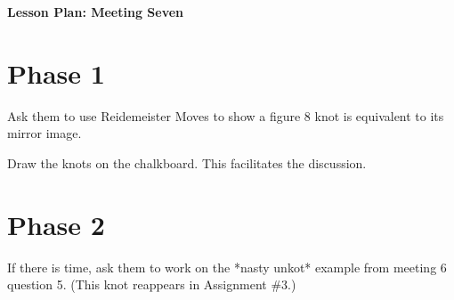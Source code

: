 \documentclass[12pt]{amsart}
\theoremstyle{definition}
\begin{document}
\begin{center}
\textbf{\Huge
Lesson Plan: Meeting Seven
}
\end{center}
\vspace{.5in}

\section*{Phase 1}
Ask them to use Reidemeister Moves to show a figure 8 knot is equivalent to its mirror image.

Draw the knots on the chalkboard. This facilitates the discussion.

\section*{Phase 2}
If there is time, ask them to work on the *nasty unkot* example from meeting 6 question 5. (This knot reappears in Assignment \#3.)
\end{document}
